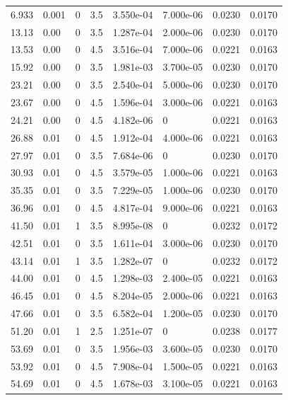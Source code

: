\documentclass[preview]{standalone}
\begin{document}
{{\begin{tabular}{L{1.2cm}C{1.2cm} C{0.3cm}C{0.5cm} C{1.4cm}C{1.4cm} C{1.4cm}C{1.4cm}}
  6.933  &  0.001  & 0     & 3.5 &  3.550e-04  & 7.000e-06  & 0.0230 &  0.0170   \\ 
  13.13  &  0.00  & 0     & 3.5 &  1.287e-04  & 2.000e-06  & 0.0230 &  0.0170   \\ 
  13.53  &  0.00  & 0     & 4.5 &  3.516e-04  & 7.000e-06  & 0.0221 &  0.0163   \\ 
  15.92  &  0.00  & 0     & 3.5 &  1.981e-03  & 3.700e-05  & 0.0230 &  0.0170   \\ 
  23.21  &  0.00  & 0     & 3.5 &  2.540e-04  & 5.000e-06  & 0.0230 &  0.0170   \\ 
  23.67  &  0.00  & 0     & 4.5 &  1.596e-04  & 3.000e-06  & 0.0221 &  0.0163   \\ 
  24.21  &  0.00  & 0     & 4.5 &  4.182e-06  & 0  & 0.0221 &  0.0163   \\ 
  26.88  &  0.01  & 0     & 4.5 &  1.912e-04  & 4.000e-06  & 0.0221 &  0.0163   \\ 
  27.97  &  0.01  & 0     & 3.5 &  7.684e-06  & 0  & 0.0230 &  0.0170   \\ 
  30.93  &  0.01  & 0     & 4.5 &  3.579e-05  & 1.000e-06  & 0.0221 &  0.0163   \\ 
  35.35  &  0.01  & 0     & 3.5 &  7.229e-05  & 1.000e-06  & 0.0230 &  0.0170   \\ 
  36.96  &  0.01  & 0     & 4.5 &  4.817e-04  & 9.000e-06  & 0.0221 &  0.0163   \\ 
  41.50  &  0.01  & 1     & 3.5 &  8.995e-08  & 0  & 0.0232 &  0.0172   \\ 
  42.51  &  0.01  & 0     & 3.5 &  1.611e-04  & 3.000e-06  & 0.0230 &  0.0170   \\ 
  43.14  &  0.01  & 1     & 3.5 &  1.282e-07  & 0  & 0.0232 &  0.0172   \\ 
  44.00  &  0.01  & 0     & 4.5 &  1.298e-03  & 2.400e-05  & 0.0221 &  0.0163   \\ 
  46.45  &  0.01  & 0     & 4.5 &  8.204e-05  & 2.000e-06  & 0.0221 &  0.0163   \\ 
  47.66  &  0.01  & 0     & 3.5 &  6.582e-04  & 1.200e-05  & 0.0230 &  0.0170   \\ 
  51.20  &  0.01  & 1     & 2.5 &  1.251e-07  & 0  & 0.0238 &  0.0177   \\ 
  53.69  &  0.01  & 0     & 3.5 &  1.956e-03  & 3.600e-05  & 0.0230 &  0.0170   \\ 
  53.92  &  0.01  & 0     & 4.5 &  7.908e-04  & 1.500e-05  & 0.0221 &  0.0163   \\ 
  54.69  &  0.01  & 0     & 4.5 &  1.678e-03  & 3.100e-05  & 0.0221 &  0.0163   \\ 

\end{tabular}}}
\end{document}
